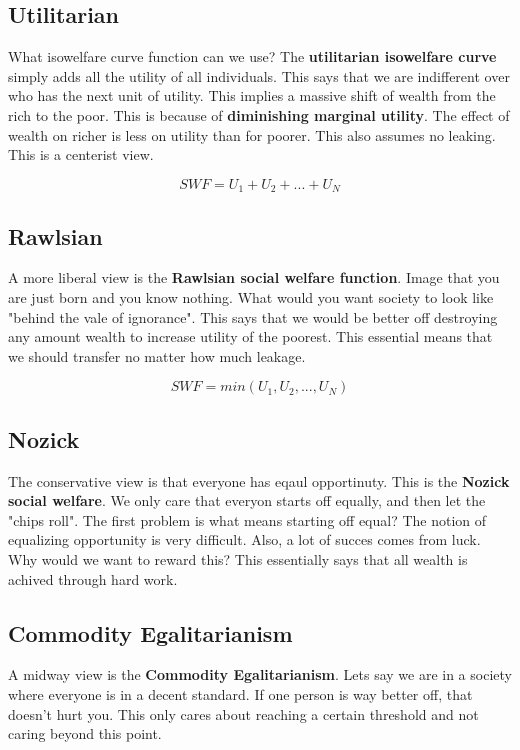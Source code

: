 \documentclass{article}
\begin{document}
\subsection{ Utilitarian }

What isowelfare curve function can we use? The \textbf{utilitarian isowelfare
curve} simply adds all the utility of all individuals. This says that we are
indifferent over who has the next unit of utility. This implies a massive shift
of wealth from the rich to the poor. This is because of \textbf{diminishing
marginal utility}. The effect of wealth on richer is less on utility than for
poorer. This also assumes no leaking. This is a centerist view.

$$ SWF = U_{1} + U_{2} + ... + U_{N} $$

\subsection{ Rawlsian }

A more liberal view is the \textbf{Rawlsian social welfare function}. Image that
you are just born and you know nothing. What would you want society to look like
"behind the vale of ignorance". This says that we would be better off destroying
any amount wealth to increase utility of the poorest. This essential means that
we should transfer no matter how much leakage.

$$ SWF = min( U_{1}, U_{2}, ..., U_{N} ) $$

\subsection{ Nozick }

The conservative view is that everyone has eqaul opportinuty. This is the
\textbf{Nozick social welfare}. We only care that everyon starts off equally,
and then let the "chips roll". The first problem is what means starting off
equal? The notion of equalizing opportunity is very difficult. Also, a lot of
succes comes from luck. Why would we want to reward this? This essentially says
that all wealth is achived through hard work.

\subsection{ Commodity Egalitarianism }

A midway view is the \textbf{Commodity Egalitarianism}. Lets say we are in a
society where everyone is in a decent standard. If one person is way better off,
that doesn't hurt you. This only cares about reaching a certain threshold and
not caring beyond this point.
\end{document}
